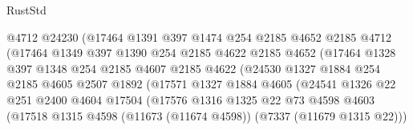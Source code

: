 \begin{lexlean}{RustStd}
\begin{coremodule}
                              @4712
                              @24230
                              (@17464
                                @1391
                                @397
                                @1474
                                @254
                                @2185
                                @4652
                                @2185
                                @4712
                                (@17464
                                  @1349
                                  @397
                                  @1390
                                  @254
                                  @2185
                                  @4622
                                  @2185
                                  @4652
                                  (@17464
                                    @1328
                                    @397
                                    @1348
                                    @254
                                    @2185
                                    @4607
                                    @2185
                                    @4622
                                    (@24530
                                      @1327
                                      @1884
                                      @254
                                      @2185
                                      @4605
                                      @2507
                                      @1892
                                      (@17571
                                        @1327
                                        @1884
                                        @4605
                                        (@24541
                                          @1326
                                          @22
                                          @251
                                          @2400
                                          @4604
                                          @17504
                                          (@17576
                                            @1316
                                            @1325
                                            @22
                                            @73
                                            @4598
                                            @4603
                                            (@17518
                                              @1315
                                              @4598
                                              (@11673 (@11674 @4598))
                                              (@7337 (@11679 @1315 @22)))

\end{coremodule}
\end{lexlean}
